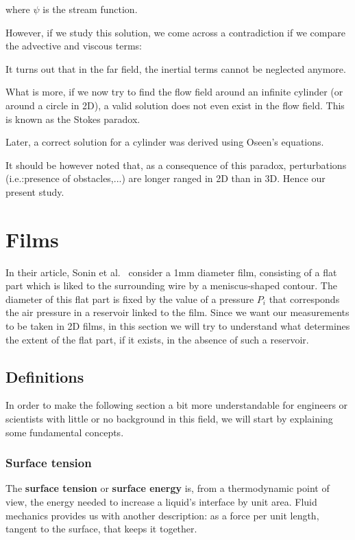 where $\psi$ is the stream function.

However, if we study this solution, we come across a contradiction if we compare the advective and viscous terms:


It turns out that in the far field, the inertial terms cannot be neglected anymore.

What is more, if we now try to find the flow field around an infinite cylinder (or around a circle in 2D), a valid solution does not even exist in the flow field. This is known as the Stokes paradox.

Later, a correct solution for a cylinder was derived using Oseen's equations. 

It should be however noted that, as a consequence of this paradox, perturbations (i.e.:presence of obstacles,...) are longer ranged in 2D than in 3D. Hence our present study. 

\section{Films}

In their article, Sonin et al.~\cite{SONIN1994} consider a 1mm diameter film, consisting of a flat part which is liked to the surrounding wire by a meniscus-shaped contour. The diameter of this flat part is fixed by the value of a pressure $P_i$ that corresponds the air pressure in a reservoir linked to the film. Since we want our measurements to be taken in 2D films, in this section we will try to understand what determines the extent of the flat part, if it exists, in the absence of such a reservoir.

\subsection{Definitions}

In order to make the following section a bit more understandable for engineers or scientists with little or no background in this field, we will start by explaining some fundamental concepts.

\subsubsection{Surface tension}

The \textbf{surface tension} or \textbf{surface energy} is, from a thermodynamic point of view, the energy needed to increase a liquid's interface by unit area. Fluid mechanics provides us with another description: as a force per unit length, tangent to the surface, that keeps it together.

